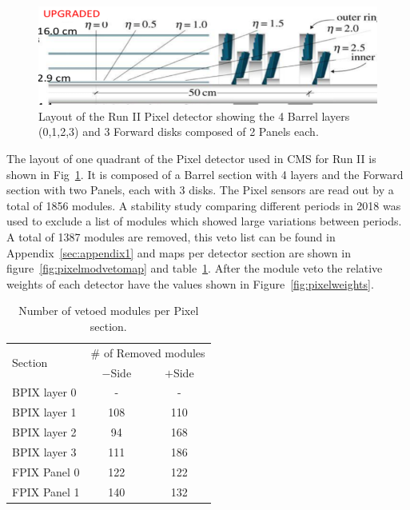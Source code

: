 
\begin{figure}[t]
  \begin{center}
    \includegraphics[width=0.9\linewidth]{plots/PixLayout.png}
    \caption{
      Layout of the Run II Pixel detector showing the 4 Barrel layers (0,1,2,3) and 3 Forward disks composed of 2 Panels each. 
    \label{fig:pixellayout}
    }
  \end{center}
\end{figure}


The layout of one quadrant of the Pixel detector used in CMS for  Run II is shown in Fig~\ref{fig:pixellayout}.
It is composed of a Barrel section with 4 layers and the Forward section with two Panels, each with 3 disks.
The Pixel sensors are read out by a total of 1856 modules.
A stability study comparing different periods in 2018 was used to exclude a list of modules which showed large variations between periods.
A total of 1387 modules are removed, this veto list can be found in Appendix~\ref{sec:appendix1} and maps per detector section are shown in figure~\ref{fig:pixelmodvetomap} and table~\ref{tab:pixveto}.
After the module veto the relative weights of each detector have the values shown in Figure~\ref{fig:pixelweights}.

\begin{table}[hc]
\caption{Number of vetoed modules per Pixel section.}
\label{tab:pixveto}
\begin{center}
\begin{tabular}{l|c|c}
\hline
\multirow{2}{*}{Section} & \multicolumn{2}{c}{$\#$ of Removed modules}  \\
  & $-$Side & $+$Side \\
\hline
BPIX layer 0 & - & - \\
BPIX layer 1 & 108 & 110 \\
BPIX layer 2 & 94  & 168 \\
BPIX layer 3 & 111 & 186 \\
FPIX Panel 0 & 122 & 122 \\
FPIX Panel 1 & 140 & 132 \\
\hline\hline
\end{tabular}
\end{center}
\end{table}


